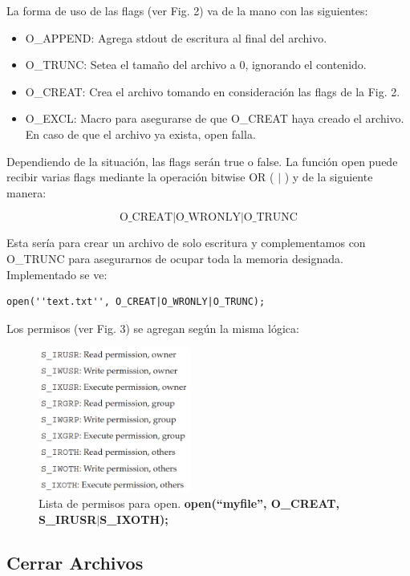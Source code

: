 \documentclass[journal]{IEEEtai}
\begin{document}
La forma de uso de las flags (ver Fig. 2) va de la mano con las siguientes: 

\begin{itemize}
\item	O\_APPEND: Agrega stdout de escritura al final del archivo.
\item	O\_TRUNC: Setea el tamaño del archivo a 0, ignorando el contenido.
\item	O\_CREAT: Crea el archivo tomando en consideración las flags de la Fig. 2.
\item O\_EXCL: Macro para asegurarse de que O\_CREAT haya creado el archivo. En caso de que el archivo ya exista, open falla.
\end{itemize}

Dependiendo de la situación, las flags serán true o false. La función open puede recibir varias flags mediante la operación bitwise OR ( $|$ ) y de la siguiente manera:

\begin{equation}
\text{O\_CREAT} | \text{O\_WRONLY} | \text{O\_TRUNC}
\end{equation}

Esta sería para crear un archivo de solo escritura y complementamos con O\_TRUNC para asegurarnos de ocupar toda la memoria designada. Implementado se ve:

\begin{verbatim}
open(''text.txt'', O_CREAT|O_WRONLY|O_TRUNC);
\end{verbatim}

Los permisos (ver Fig. 3) se agregan según la misma lógica:

\begin{figure}[!h]
\centering
\includegraphics[width=5cm]{img/permisos.png}
\caption{Lista de permisos para open. \textbf{open(“myfile”, O\_CREAT, S\_IRUSR$|$S\_IXOTH);}}
\label{fig}
\end{figure}


\subsection{Cerrar Archivos}
\end{document}
